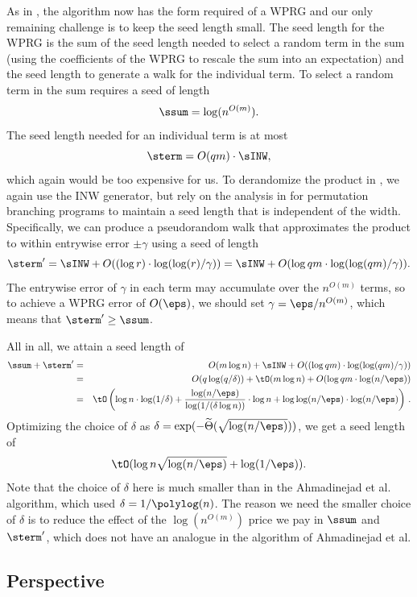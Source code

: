     As in , the algorithm now has the form required of a WPRG and our only remaining challenge is to keep the seed length small. 
    The seed length
    for the WPRG is the sum of the seed length needed to select a random term in the sum (using the coefficients of the WPRG to rescale the sum into an expectation) and the seed length to generate a walk for the individual term.
    To select a random term in the sum requires a seed of length
    $$\ssum = \log (n^{O(m)}).$$
    The seed length needed for an individual term is at most $$\sterm = O(qm)\cdot \sINW,$$
    which again would be too expensive for us.
    To derandomize the product in , 
    we again use the INW generator, but
    rely on the analysis in \cite{HozaPyVa21} for permutation branching
    programs to maintain a seed length that is independent of the width.  Specifically, we can produce a pseudorandom walk that approximates the product to within entrywise error $\pm \gamma$ using a seed of length 
    $$\sterm' = \sINW+O((\log r)\cdot \log(\log(r)/\gamma))
    = \sINW + O(\log qm\cdot \log(\log(qm)/\gamma)).$$
    The entrywise error of $\gamma$ in each term may accumulate over the $n^{O(m)}$ terms, so to achieve a WPRG error of $O(\eps)$, we should set $\gamma=\eps/n^{O(m)}$, which means that $\sterm' \geq \ssum$.  
    
    All in all, we attain a seed length of
    \begin{eqnarray*}
    \ssum+\sterm' 
    &=& O(m\log n)+\sINW+O((\log qm)\cdot \log(\log(qm)/\gamma))\\
    &=& O(q\log(q/\delta)) + \tO(m\log n) + O(\log qm\cdot \log(n/\eps))\\
    &=& \tO\left(\log n\cdot \log(1/\delta) + \frac{\log(n/\eps)}{\log(1/(\delta\log n))}\cdot \log n + \log\log(n/\eps)\cdot \log(n/\eps)\right)\,.
    \end{eqnarray*}
    Optimizing the choice of $\delta$ as $\delta = \exp(-\widetilde{\Theta}(\sqrt{\log(n/\eps)}))$, we get a seed length of
    $$\tO(\log n\sqrt{\log(n/\eps)} + \log(1/\eps)).$$
    Note that the choice of $\delta$ here is much smaller than in 
    the %
Ahmadinejad  %
et al. algorithm, which used $\delta=1/\polylog(n)$.
    The reason we need the smaller choice of $\delta$ is to reduce the effect of the $\log(n^{O(m)})$ price we pay in $\ssum$ and $\sterm'$, which does not have an analogue in the algorithm of
%
Ahmadinejad  %
et al.
    
\subsection{Perspective}



